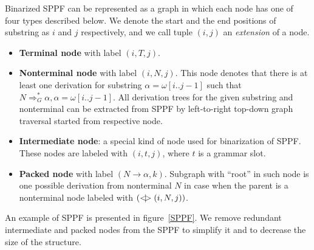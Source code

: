 Binarized SPPF can be represented as a graph in which each node has one of four types described below.
We denote the start and the end positions of substring as $i$ and $j$ respectively, and we call tuple $(i,j)$ an \textit{extension} of a node.

\begin{itemize}
    \item \textbf{Terminal node} with label $(i, T, j)$.
    \item \textbf{Nonterminal node} with label $(i, N, j)$. 
    This node denotes that there is at least one derivation for substring $\alpha=\omega[i..j-1]$ such that $N \Rightarrow^*_G \alpha, \alpha = \omega[i..j-1] $.
    All derivation trees for the given substring and nonterminal can be extracted from SPPF by left-to-right top-down graph traversal started from respective node.     
    \item \textbf{Intermediate node}: a special kind of node used for binarization of SPPF. These nodes are labeled with $(i,t,j)$, where $t$ is a grammar slot.
    \item \textbf{Packed node} with label $(N \rightarrow \alpha, k)$. 
    Subgraph with ``root'' in such node is one possible derivation from nonterminal $N$ in case when the parent is a nonterminal node labeled with $(<\mkern-9mu | \mkern-9mu> (i, N, j))$.

\end{itemize}

An example of SPPF is presented in figure~\ref{SPPF}. We remove redundant intermediate and packed nodes from the SPPF to simplify it and to decrease the size of the structure.

